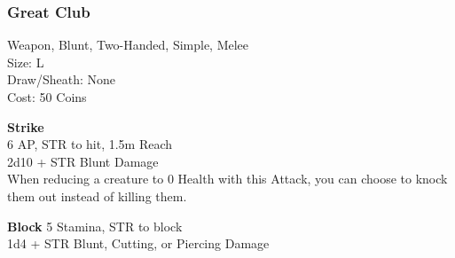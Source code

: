 \subsubsection{Great Club}\label{weapon:greatClub}
Weapon, Blunt, Two-Handed, Simple, Melee\\
Size: L\\
Draw/Sheath: None\\
Cost: 50 Coins

\textbf{Strike} \\
6 AP, STR to hit, 1.5m Reach\\
2d10 + \texttimes STR Blunt Damage\\
When reducing a creature to 0 Health with this Attack, you can choose to knock them out instead of killing them.

\textbf{Block}
5 Stamina, STR to block\\
1d4 + \texttimes STR Blunt, Cutting, or Piercing Damage

